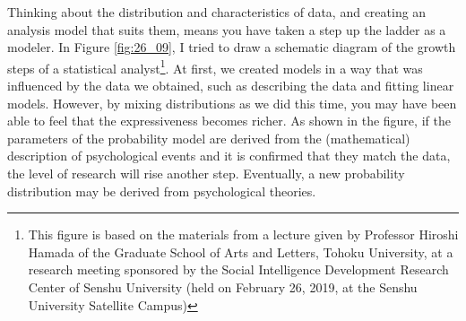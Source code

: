 \documentclass{ltjsbook}
\begin{document}
Thinking about the distribution and characteristics of data, and creating an analysis model that suits them, means you have taken a step up the ladder as a modeler. In Figure \ref{fig:26_09}, I tried to draw a schematic diagram of the growth steps of a statistical analyst\footnote{This figure is based on the materials from a lecture given by Professor Hiroshi Hamada of the Graduate School of Arts and Letters, Tohoku University, at a research meeting sponsored by the Social Intelligence Development Research Center of Senshu University (held on February 26, 2019, at the Senshu University Satellite Campus)}. At first, we created models in a way that was influenced by the data we obtained, such as describing the data and fitting linear models. However, by mixing distributions as we did this time, you may have been able to feel that the expressiveness becomes richer. As shown in the figure, if the parameters of the probability model are derived from the (mathematical) description of psychological events and it is confirmed that they match the data, the level of research will rise another step. Eventually, a new probability distribution may be derived from psychological theories.

\end{document}
